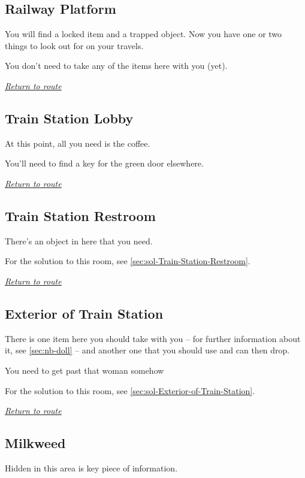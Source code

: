 \documentclass[a5paper]{extarticle}
\begin{document}
\subsection{Railway Platform}\label{sec:req-Railway-Platform-0}

You will find a locked item and a trapped object.
Now you have one or two things to look out for on your travels.

You don't need to take any of the items here with you (yet).

\hyperref[sec:route]{\emph{Return to route}}

\newpage
\subsection{Train Station Lobby}\label{sec:req-Train-Station-Lobby-0}

At this point, all you need is the coffee.

You'll need to find a key for the green door elsewhere.

\hyperref[sec:route]{\emph{Return to route}}

\newpage
\subsection{Train Station Restroom}\label{sec:req-Train-Station-Restroom}

There's an object in here that you need.

For the solution to this room, see \cref{sec:sol-Train-Station-Restroom}.

\hyperref[sec:route]{\emph{Return to route}}

\newpage
\subsection{Exterior of Train Station}\label{sec:req-Exterior-of-Train-Station}

There is one item here you should take with you --
for further information about it, see \cref{sec:nb-doll} --
and another one that you should use and can then drop.

You need to get past that woman somehow\xelip

For the solution to this room, see \cref{sec:sol-Exterior-of-Train-Station}.

\hyperref[sec:route]{\emph{Return to route}}

\newpage
\subsection{Milkweed}\label{sec:req-Milkweed}
Hidden in this area is key piece of information.
\end{document}
